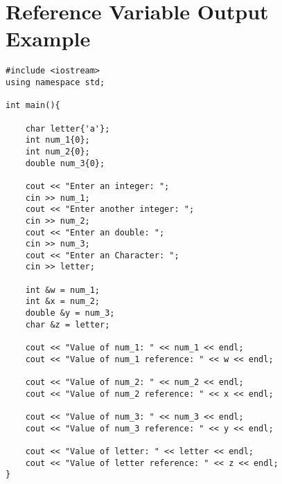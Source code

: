 \documentclass[12pt]{article}
\begin{document}
\section*{Reference Variable Output Example}
\begin{verbatim}
#include <iostream>
using namespace std;

int main(){

    char letter{'a'};
    int num_1{0};
    int num_2{0};
    double num_3{0};

    cout << "Enter an integer: ";
    cin >> num_1;
    cout << "Enter another integer: ";
    cin >> num_2;
    cout << "Enter an double: ";
    cin >> num_3;
    cout << "Enter an Character: ";
    cin >> letter;

    int &w = num_1;
    int &x = num_2;
    double &y = num_3;
    char &z = letter;

    cout << "Value of num_1: " << num_1 << endl;
    cout << "Value of num_1 reference: " << w << endl; 

    cout << "Value of num_2: " << num_2 << endl; 
    cout << "Value of num_2 reference: " << x << endl; 

    cout << "Value of num_3: " << num_3 << endl; 
    cout << "Value of num_3 reference: " << y << endl;

    cout << "Value of letter: " << letter << endl; 
    cout << "Value of letter reference: " << z << endl; 
}
\end{verbatim}
\end{document}
